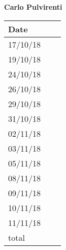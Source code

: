 \documentclass[../main.tex]{subfiles}
\begin{document}
\begin{center}
	{\bf Carlo Pulvirenti}
	\vspace{2mm}

		\begin{tabular}{p{1.3cm}|p{1.8cm}|p{6.7cm}}
			\hline
			\bf Date & \bf \makebox[1.8cm][c]{Hours} & \bf \makebox[6.7cm][c]{Description} \\
			\hline
			17/10/18 & \makebox[1.8cm][c]{2h} & \makebox[6.7cm][c]{Introduction}\\
			19/10/18 & \makebox[1.8cm][c]{3h} & \makebox[6.7cm][c]{Goals, Requirements, Domain assumptions}\\
			24/10/18 & \makebox[1.8cm][c]{4h} & \makebox[6.7cm][c]{Goals, Requirements, Domain assumptions}\\
			26/10/18 & \makebox[1.8cm][c]{2h} & \makebox[6.7cm][c]{Purpose, Scope}\\
			29/10/18 & \makebox[1.8cm][c]{6h} & \makebox[6.7cm][c]{Use Cases}\\
			31/10/18 & \makebox[1.8cm][c]{6h} & \makebox[6.7cm][c]{Use Cases, Scenarios}\\
			02/11/18 & \makebox[1.8cm][c]{4h} & \makebox[6.7cm][c]{Scenarios}\\
			03/11/18 & \makebox[1.8cm][c]{1h} & \makebox[6.7cm][c]{UML Class \& State Machine Diagrams}\\
			05/11/18 & \makebox[1.8cm][c]{4h} & \makebox[6.7cm][c]{Scenarios, Sequence Diagrams}\\
			08/11/18 & \makebox[1.8cm][c]{2h} & \makebox[6.7cm][c]{Sequence Diagramm, Alloy}\\
			09/11/18 & \makebox[1.8cm][c]{2h} & \makebox[6.7cm][c]{Sequence Diagram, Revisioning}\\
			10/11/18 & \makebox[1.8cm][c]{2h} & \makebox[6.7cm][c]{Revisioning}\\
			11/11/18 & \makebox[1.8cm][c]{4h} & \makebox[6.7cm][c]{Revisioning}\\
			total    & \makebox[1.8cm][c]{42h}
		\end{tabular}
\end{center}

\vspace{1cm}

\newpage
\end{document}
